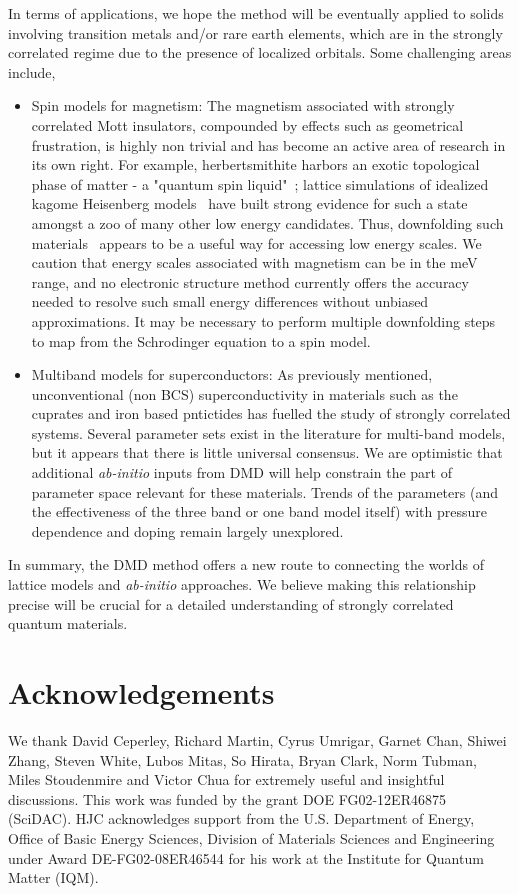 In terms of applications, we hope the method will be eventually applied to solids involving transition 
metals and/or rare earth elements, which are in the strongly correlated regime due to the presence of localized orbitals. 
Some challenging areas include,
\begin{itemize} 
	\item Spin models for magnetism: 
	The magnetism associated with strongly correlated Mott insulators, compounded by effects such as geometrical frustration, 
	is highly non trivial and has become an active area of research in its own right. 
	For example, herbertsmithite harbors an exotic topological phase of matter - a "quantum spin liquid"~\cite{NormanRMP}; 
	lattice simulations of idealized kagome Heisenberg models~\cite{Yan_Huse_White, Changlani_kagome} have built strong evidence 
	for such a state amongst a zoo of many other low energy candidates. Thus, 
	downfolding such materials~\cite{Jeschke} appears to be a useful way for accessing low energy scales. 
	We caution that energy scales associated with magnetism can be in the meV range, and no electronic structure 
	method currently offers the accuracy needed to resolve such small energy differences without unbiased approximations. 
	It may be necessary to perform multiple downfolding steps to map from the Schrodinger equation to a spin model.
	\item Multiband models for superconductors:
	As previously mentioned, unconventional (non BCS) superconductivity in materials such as the cuprates and iron based 
	pntictides has fuelled the study of strongly correlated systems.
	Several parameter sets exist in the literature for multi-band models, but it appears that there is little universal consensus. 
	We are optimistic that additional \emph{ab-initio} inputs from DMD will help constrain the part of parameter 
	space relevant for these materials. Trends of the parameters (and the effectiveness of the three band 
	or one band model itself) with pressure dependence and doping remain largely unexplored.  
\end{itemize} 
In summary, the DMD method offers a new route to connecting the worlds of lattice models and \textit{ab-initio} approaches. 
We believe making this relationship precise will be crucial for a detailed understanding of strongly correlated 
quantum materials. 

\section{Acknowledgements} 
We thank  David Ceperley,  Richard Martin, Cyrus Umrigar,  Garnet Chan,  Shiwei Zhang, Steven White,  
Lubos Mitas, So Hirata, Bryan Clark, Norm Tubman, Miles Stoudenmire and Victor Chua for extremely useful and insightful discussions. 
This work was funded by the grant DOE FG02-12ER46875 (SciDAC). HJC acknowledges support from the U.S. Department of Energy, 
Office of Basic Energy Sciences, Division of Materials Sciences and Engineering under Award DE-FG02-08ER46544 for his work at the Institute for Quantum Matter (IQM). 

